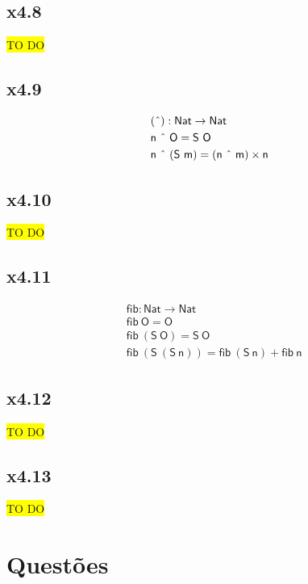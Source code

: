 \documentclass[portuguese,a4paper,12pt]{article}
\begin{document}
	\subsection*{x4.8}
	
	\colorbox{yellow}{TO DO}
	
	\subsection*{x4.9}
	
	\begin{align*}
		& \mathsf{(\text{\^{}}) : Nat \to Nat} \\
		& \mathsf{n \ \text{\^{}}\ O = S\ O} \\
		& \mathsf{n\ \text{\^{}}\ (S\ m) = (n\ \text{\^{}}\ m) \times n}
	\end{align*}
	
	\subsection*{x4.10}
	
	\colorbox{yellow}{TO DO}
	
	\subsection*{x4.11}
	
	\begin{align*}
		& \mathsf{fib : Nat \to Nat} \\
		& \mathsf{fib\ O = O} \\
		& \mathsf{fib\ (S\ O) = S\ O} \\
		& \mathsf{fib\ (S\ (S\ n)) = fib\ (S\ n) + fib\ n}
	\end{align*}
	
	\subsection*{x4.12}
	
	\colorbox{yellow}{TO DO}
	
	\subsection*{x4.13}
	
	\colorbox{yellow}{TO DO}
	
	\section*{\centering Questões}
	
\end{document}
